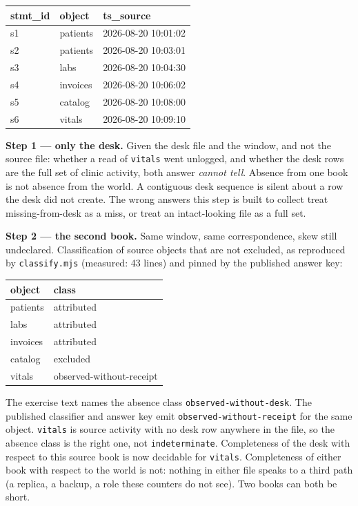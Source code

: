 \documentclass[11pt]{article}
\begin{document}
\vspace{1em}

\begin{tabular}{lll}
\toprule
stmt\_id & object & ts\_source \\
\midrule
s1 & patients & 2026-08-20 10:01:02 \\
s2 & patients & 2026-08-20 10:03:01 \\
s3 & labs & 2026-08-20 10:04:30 \\
s4 & invoices & 2026-08-20 10:06:02 \\
s5 & catalog & 2026-08-20 10:08:00 \\
s6 & vitals & 2026-08-20 10:09:10 \\
\bottomrule
\end{tabular}

\vspace{1em}

\textbf{Step 1 --- only the desk.} Given the desk file and the window, and not the source file: whether a read of \texttt{vitals} went unlogged, and whether the desk rows are the full set of clinic activity, both answer \emph{cannot tell}. Absence from one book is not absence from the world. A contiguous desk sequence is silent about a row the desk did not create. The wrong answers this step is built to collect treat missing-from-desk as a miss, or treat an intact-looking file as a full set.

\textbf{Step 2 --- the second book.} Same window, same correspondence, skew still undeclared. Classification of source objects that are not excluded, as reproduced by \texttt{classify.mjs} (measured: 43 lines) and pinned by the published answer key:

\begin{tabular}{ll}
\toprule
object & class \\
\midrule
patients & attributed \\
labs & attributed \\
invoices & attributed \\
catalog & excluded \\
vitals & observed-without-receipt \\
\bottomrule
\end{tabular}

\vspace{1em}

The exercise text names the absence class \texttt{observed-without-desk}. The published classifier and answer key emit \texttt{observed-without-receipt} for the same object. \texttt{vitals} is source activity with no desk row anywhere in the file, so the absence class is the right one, not \texttt{indeterminate}. Completeness of the desk with respect to this source book is now decidable for \texttt{vitals}. Completeness of either book with respect to the world is not: nothing in either file speaks to a third path (a replica, a backup, a role these counters do not see). Two books can both be short.
\end{document}
